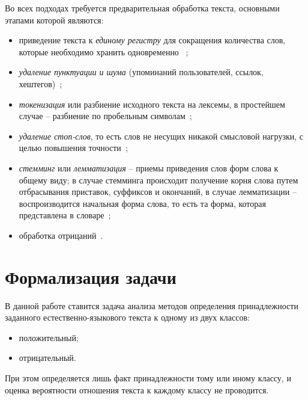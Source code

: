 Во всех подходах требуется предварительная обработка текста, основными этапами
которой являются:
\begin{itemize}
    \item приведение текста к \textit{единому регистру} для сокращения
        количества слов, которые необходимо хранить одновременно
       ~\cite{article06};
    \item \textit{удаление пунктуации и шума} (упоминаний пользователей, ссылок,
        хештегов)~\cite{article06};
    \item \textit{токенизация} или разбиение исходного текста на лексемы, в простейшем
        случае -- разбиение по пробельным символам~\cite{article07};
    \item \textit{удаление стоп-слов}, то есть слов не несущих никакой смысловой
        нагрузки, с целью повышения точности~\cite{article06};
    \item \textit{стемминг} или \textit{лемматизация} -- приемы приведения слов
        форм слова к общему виду; в случае стемминга происходит получение корня
        слова путем отбрасывания приставок, суффиксов и окончаний, в случае
        лемматизации -- воспроизводится начальная форма слова, то есть та форма,
        которая представлена в словаре~\cite{article06};
    \item обработка отрицаний~\cite{article08}.
\end{itemize}

\section{Формализация задачи}

В данной работе ставится задача анализа методов определения принадлежности
заданного естественно-языкового текста к одному из двух классов:
\begin{itemize}
    \item положительный;
    \item отрицательный.
\end{itemize}

При этом определяется лишь факт принадлежности тому или иному классу, и оценка
вероятности отношения текста к каждому классу не проводится.

